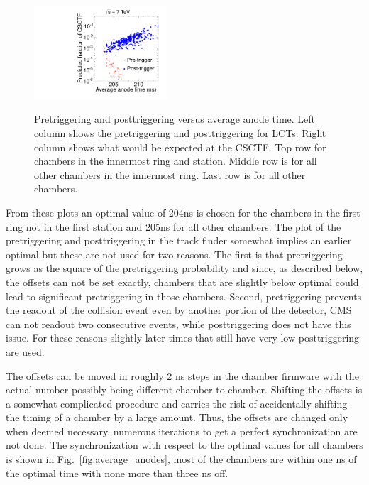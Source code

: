 \begin{figure}
\begin{center}
      \includegraphics[clip=true, trim=0.0cm 0cm 3.0cm 0cm, width=0.44\textwidth]{figures/timing/Ring2_Anode_vs_TF_all} \\
      \caption[CSC pretriggering and posttriggering versus average anode time for LCTs and expected behavior at CSCTF]
      {Pretriggering and posttriggering versus average anode time. Left column shows the pretriggering and posttriggering for LCTs.
Right column shows what would be expected at the CSCTF. Top row for chambers in the innermost ring and station. Middle row is for all other chambers in the innermost ring.
Last row is for all other chambers.
        }
      \label{fig:AnodevsprePost}
  \end{center}
\end{figure}

From these plots an optimal value of 204ns is chosen for the chambers in the first ring not in the first station and 205ns for all other chambers.
The plot of the pretriggering and posttriggering in the track finder somewhat implies an earlier optimal but these are not used for two reasons.
The first is that pretriggering grows as the square of the pretriggering probability and since, as described below, the offsets can not be set exactly, chambers
that are slightly below optimal could lead to significant pretriggering in those chambers. Second, pretriggering prevents the readout of the collision event even by
another portion of the detector, CMS can not readout two consecutive events, while posttriggering does not have this issue. For these reasons slightly later times
that still have very low posttriggering are used.

The offsets can be moved in roughly 2 ns steps in the chamber firmware with the actual number possibly being different chamber to chamber. Shifting the offsets is a
somewhat complicated procedure and carries the risk of accidentally shifting the timing of a chamber by a large amount. Thus, the offsets are changed only
when deemed necessary, numerous iterations to get a perfect synchronization are not done. The synchronization with respect to the optimal values for all chambers
is shown in Fig.~\ref{fig:average_anodes}, most of the chambers are within one ns of the optimal time with none more than three ns off.

